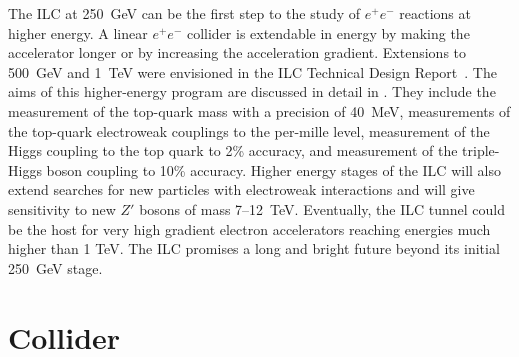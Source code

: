 \documentclass[%
 reprint,
 floatfix,
 amsmath,amssymb,
 aps,
]{revtex4-1}
\newcommand{\todo}[1]{\textcolor{red}{{#1}}}
\def\ee{e^+e^-}
\begin{document}
The ILC at 250~GeV can be the first step to the study of $\ee$
reactions at higher energy.   A linear $\ee$ collider is extendable in
energy by making the accelerator longer or by increasing the
acceleration gradient. Extensions to 500~GeV and 1~TeV were envisioned
in the ILC Technical Design Report~\cite{Behnke:2013xla}.   The aims
of 
this higher-energy program are discussed in detail in
\cite{ILCforESS}.
They include the
measurement of the top-quark mass with a precision of 40~MeV, 
measurements of the top-quark
electroweak couplings to the per-mille level, measurement of the
Higgs coupling to the top quark to 2\% accuracy, and measurement of
the triple-Higgs boson coupling to 10\%  accuracy.   Higher energy stages of the ILC will also extend searches for new particles with electroweak interactions and will give sensitivity to new $Z'$ bosons of mass 7--12~TeV. 
Eventually, the ILC tunnel could be the host for  very high
gradient electron accelerators reaching energies much higher than 1 TeV.   The 
ILC promises a long and bright future beyond its initial 250~GeV stage.



\vspace{-.4cm}

\section{\label{sec:collider}Collider}

\vspace{-.3cm}

\end{document}
